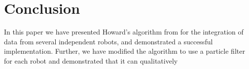 \section{Conclusion}


In this paper we have presented Howard’s algorithm from \cite{howard2006multi} for the integration of data from several independent robots, and demonstrated a successful implementation.  Further, we have modified the algorithm to use a particle filter for each robot and demonstrated that it can qualitatively 
